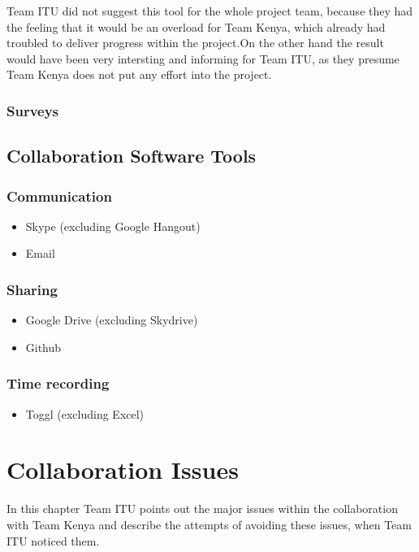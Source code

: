 Team ITU did not suggest this tool for the whole project team, because they had the feeling that it would be an overload for Team Kenya, which already had troubled to deliver progress within the project.On the other hand the result would have been very intersting and informing for Team ITU, as they presume Team Kenya does not put any effort into the project.

\subsubsection {Surveys}


\subsection{Collaboration Software Tools}

\subsubsection {Communication}
	\begin{itemize}
		\item Skype (excluding Google Hangout)
		\item Email
	\end{itemize}
\subsubsection {Sharing}
	\begin{itemize}
		\item Google Drive (excluding Skydrive)
		\item Github
	\end{itemize}
\subsubsection {Time recording}
\label{sec:timeRecTool}
	\begin{itemize}
		\item Toggl (excluding Excel)
	\end{itemize}



\section{Collaboration Issues}
In this chapter Team ITU points out the major issues within the collaboration with Team Kenya and describe the attempts of avoiding these issues, when Team ITU noticed them.

